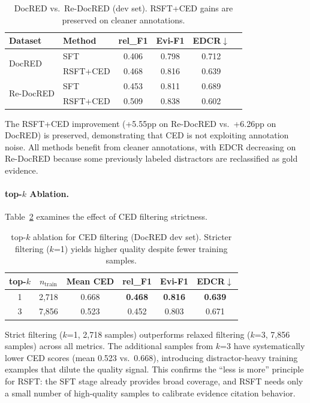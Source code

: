 \documentclass[11pt,a4paper]{article}
\newcommand{\edcr}{EDCR}
\newcommand{\rsft}{RSFT}
\begin{document}
\begin{table}[t]
\centering
\small
\caption{DocRED vs.\ Re-DocRED (dev set). \rsft{}+CED gains are preserved on cleaner annotations.}
\label{tab:redocred}
\begin{tabular}{@{}llcccc@{}}
\toprule
\textbf{Dataset} & \textbf{Method} & \textbf{rel\_F1} & \textbf{Evi-F1} & \textbf{\edcr{}$\downarrow$} \\
\midrule
\multirow{2}{*}{DocRED}    & SFT      & 0.406 & 0.798 & 0.712 \\
                           & \rsft{}+CED & 0.468 & 0.816 & 0.639 \\
\midrule
\multirow{2}{*}{Re-DocRED} & SFT      & 0.453 & 0.811 & 0.689 \\
                           & \rsft{}+CED & 0.509 & 0.838 & 0.602 \\
\bottomrule
\end{tabular}
\end{table}

The \rsft{}+CED improvement (+5.55pp on Re-DocRED vs.\ +6.26pp on DocRED) is preserved, demonstrating that CED is not exploiting annotation noise.
All methods benefit from cleaner annotations, with \edcr{} decreasing on Re-DocRED because some previously labeled distractors are reclassified as gold evidence.

\paragraph{top-$k$ Ablation.}
Table~\ref{tab:topk} examines the effect of CED filtering strictness.

\begin{table}[t]
\centering
\small
\caption{top-$k$ ablation for CED filtering (DocRED dev set). Stricter filtering ($k$=1) yields higher quality despite fewer training samples.}
\label{tab:topk}
\begin{tabular}{@{}cccccc@{}}
\toprule
\textbf{top-$k$} & $n_{\text{train}}$ & \textbf{Mean CED} & \textbf{rel\_F1} & \textbf{Evi-F1} & \textbf{\edcr{}$\downarrow$} \\
\midrule
1 & 2,718 & 0.668 & \textbf{0.468} & \textbf{0.816} & \textbf{0.639} \\
3 & 7,856 & 0.523 & 0.452 & 0.803 & 0.671 \\
\bottomrule
\end{tabular}
\end{table}

Strict filtering ($k$=1, 2,718 samples) outperforms relaxed filtering ($k$=3, 7,856 samples) across all metrics.
The additional samples from $k$=3 have systematically lower CED scores (mean 0.523 vs.\ 0.668), introducing distractor-heavy training examples that dilute the quality signal.
This confirms the ``less is more'' principle for \rsft{}: the SFT stage already provides broad coverage, and \rsft{} needs only a small number of high-quality samples to calibrate evidence citation behavior.
\end{document}
